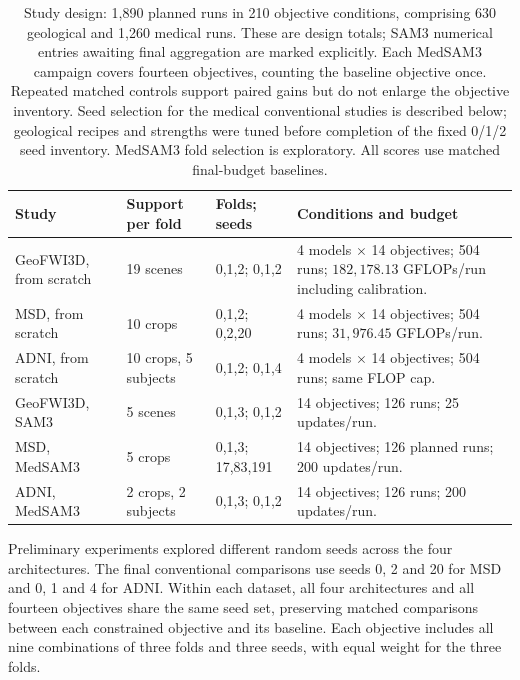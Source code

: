 \documentclass[12pt,a4paper]{article}
\begin{document}
\begin{table}[htbp]
\centering\small{}
\begin{tabular}{@{}P{2.5cm}P{3.0cm}P{3.2cm}P{5.7cm}@{}}
\hline
Study & Support per fold & Folds; seeds & Conditions and budget \\
\hline
GeoFWI3D, from scratch & 19 scenes & 0,1,2; 0,1,2 & 4 models $\times$ 14 objectives; 504 runs; $182{,}178.13$ GFLOPs/run including calibration. \\[.5em]
MSD, from scratch & 10 crops & 0,1,2; 0,2,20 & 4 models $\times$ 14 objectives; 504 runs; $31{,}976.45$ GFLOPs/run. \\[.5em]
ADNI, from scratch & 10 crops, 5 subjects & 0,1,2; 0,1,4 & 4 models $\times$ 14 objectives; 504 runs; same FLOP cap. \\[.5em]
GeoFWI3D, SAM3 & 5 scenes & 0,1,3; 0,1,2 & 14 objectives; 126 runs; 25 updates/run. \\[.5em]
MSD, MedSAM3 & 5 crops & 0,1,3; 17,83,191 & 14 objectives; 126 planned runs; 200 updates/run. \\[.5em]
ADNI, MedSAM3 & 2 crops, 2 subjects & 0,1,3; 0,1,2 & 14 objectives; 126 runs; 200 updates/run. \\
\hline
\end{tabular}
\caption{Study design: 1,890 planned runs in 210 objective conditions,
comprising 630 geological and 1,260 medical runs. These are design totals;
SAM3 numerical entries awaiting final aggregation are marked explicitly.
Each MedSAM3 campaign covers fourteen objectives, counting the baseline
objective once. Repeated matched controls support paired gains but do
not enlarge the objective inventory.
Seed selection for the medical conventional studies is described below;
geological recipes and strengths were tuned before completion of the
fixed 0/1/2 seed inventory. MedSAM3 fold selection is exploratory.
All scores use matched final-budget baselines.}
\label{tab:experimental-design}
\end{table}

Preliminary experiments explored different random seeds across the four
architectures. The final conventional comparisons use seeds 0, 2 and 20
for MSD and 0, 1 and 4 for ADNI. Within each dataset, all four
architectures and all fourteen objectives share the same seed set,
preserving matched comparisons between each constrained objective and
its baseline. Each objective includes all nine combinations of three
folds and three seeds, with equal weight for the three folds.
\end{document}
